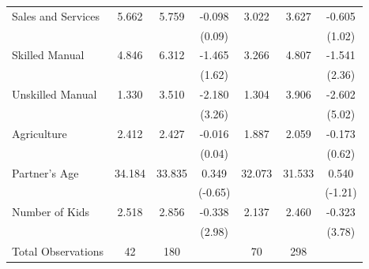 \begin{longtable}{@{}l*{6}{c}@{}}
\hspace{1em}Sales and Services & 5.662 & 5.759 & -0.098 & 3.022 & 3.627 & -0.605 \\
                    &         &         & (0.09) &         &         & (1.02) \\
\hspace{1em}Skilled Manual & 4.846 & 6.312 & -1.465 & 3.266 & 4.807 & -1.541\sym{**} \\
                    &         &         & (1.62) &         &         & (2.36) \\
\hspace{1em}Unskilled Manual & 1.330 & 3.510 & -2.180\sym{***} & 1.304 & 3.906 & -2.602\sym{***} \\
                    &         &         & (3.26) &         &         & (5.02) \\
\hspace{1em}Agriculture & 2.412 & 2.427 & -0.016 & 1.887 & 2.059 & -0.173 \\
                    &         &         & (0.04) &         &         & (0.62) \\
Partner's Age & 34.184 & 33.835 & 0.349 & 32.073 & 31.533 & 0.540 \\
                    &         &         & (-0.65) &         &         & (-1.21) \\
Number of Kids & 2.518 & 2.856 & -0.338\sym{***} & 2.137 & 2.460 & -0.323\sym{***} \\
                    &         &         & (2.98) &         &         & (3.78) \\
\hline
Total Observations & 42 & 180 &  & 70 & 298 &  \\

\end{longtable}